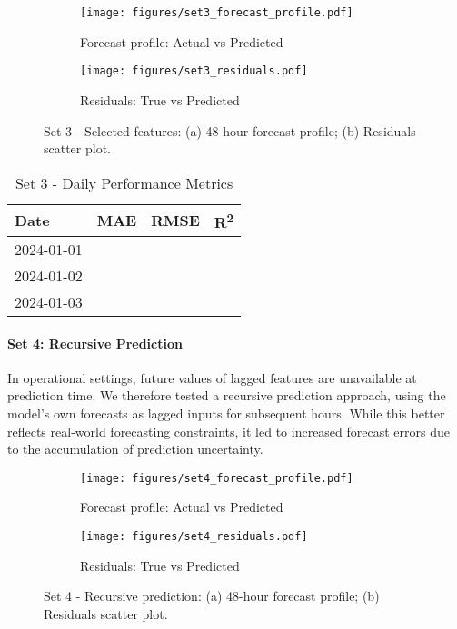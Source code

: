 \begin{figure}[H]
    \centering
    \begin{subfigure}{0.49\textwidth}
        \texttt{[image: figures/set3\_forecast\_profile.pdf]}
        \caption{Forecast profile: Actual vs Predicted}
    \end{subfigure}
    \begin{subfigure}{0.49\textwidth}
        \texttt{[image: figures/set3\_residuals.pdf]}
        \caption{Residuals: True vs Predicted}
    \end{subfigure}
    \caption{Set 3 - Selected features: (a) 48-hour forecast profile; (b) Residuals scatter plot.}
\end{figure}

\begin{table}[H]
    \centering
    \caption{Set 3 - Daily Performance Metrics}
    \begin{tabular}{lccc}
        \toprule
        Date        & MAE    & RMSE   & R\textsuperscript{2} \\
        \midrule
        2024-01-01  &        &        &       \\
        2024-01-02  &        &        &       \\
        2024-01-03  &        &        &       \\
        \bottomrule
    \end{tabular}
\end{table}

\paragraph{Set 4: Recursive Prediction}
In operational settings, future values of lagged features are unavailable at prediction 
time. We therefore tested a recursive prediction approach, using the model’s own forecasts as 
lagged inputs for subsequent hours. While this better reflects real-world forecasting 
constraints, it led to increased forecast errors due to the accumulation of prediction uncertainty.

\begin{figure}[H]
    \centering
    \begin{subfigure}{0.49\textwidth}
        \texttt{[image: figures/set4\_forecast\_profile.pdf]}
        \caption{Forecast profile: Actual vs Predicted}
    \end{subfigure}
    \begin{subfigure}{0.49\textwidth}
        \texttt{[image: figures/set4\_residuals.pdf]}
        \caption{Residuals: True vs Predicted}
    \end{subfigure}
    \caption{Set 4 - Recursive prediction: (a) 48-hour forecast profile; (b) Residuals scatter plot.}
\end{figure}

